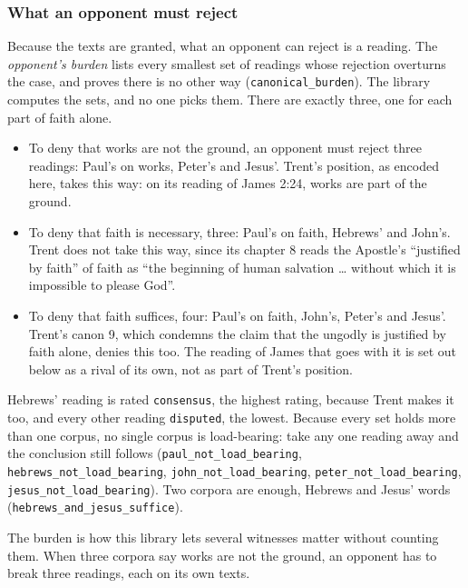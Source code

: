 \documentclass[11pt,paper=\testimonypaper,DIV=13,parskip=false]{scrartcl}
\begin{document}
\subsubsection*{What an opponent must reject}
Because the texts are granted, what an opponent can reject is a reading. The \emph{opponent’s burden} lists every smallest set of readings whose rejection overturns the case, and proves there is no other way (\texttt{canonical\_\allowbreak{}burden}). The library computes the sets, and no one picks them. There are exactly three, one for each part of faith alone.

\begin{itemize}
  \item To deny that works are not the ground, an opponent must reject three readings: Paul’s on works, Peter’s and Jesus’. Trent’s position, as encoded here, takes this way: on its reading of James 2:24, works are part of the ground.
  \item To deny that faith is necessary, three: Paul’s on faith, Hebrews’ and John’s. Trent does not take this way, since its chapter 8 reads the Apostle’s “justified by faith” of faith as “the beginning of human salvation … without which it is impossible to please God”.
  \item To deny that faith suffices, four: Paul’s on faith, John’s, Peter’s and Jesus’. Trent’s canon 9, which condemns the claim that the ungodly is justified by faith alone, denies this too. The reading of James that goes with it is set out below as a rival of its own, not as part of Trent’s position.
\end{itemize}
Hebrews’ reading is rated \texttt{consensus}, the highest rating, because Trent makes it too, and every other reading \texttt{disputed}, the lowest. Because every set holds more than one corpus, no single corpus is load-bearing: take any one reading away and the conclusion still follows (\texttt{paul\_\allowbreak{}not\_\allowbreak{}load\_\allowbreak{}bearing}, \texttt{hebrews\_\allowbreak{}not\_\allowbreak{}load\_\allowbreak{}bearing}, \texttt{john\_\allowbreak{}not\_\allowbreak{}load\_\allowbreak{}bearing}, \texttt{peter\_\allowbreak{}not\_\allowbreak{}load\_\allowbreak{}bearing}, \texttt{jesus\_\allowbreak{}not\_\allowbreak{}load\_\allowbreak{}bearing}). Two corpora are enough, Hebrews and Jesus’ words (\texttt{hebrews\_\allowbreak{}and\_\allowbreak{}jesus\_\allowbreak{}suffice}).

The burden is how this library lets several witnesses matter without counting them. When three corpora say works are not the ground, an opponent has to break three readings, each on its own texts.
\end{document}
